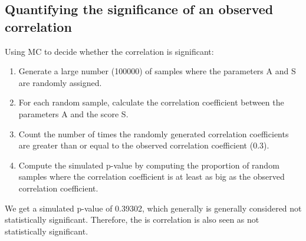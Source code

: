 \subsection{Quantifying the significance of an observed correlation}
Using MC to decide whether the correlation is significant:
\begin{enumerate}
    \item Generate a large number (100000) of samples where the parameters A and S are randomly assigned.
    \item For each random sample, calculate the correlation coefficient between the parameters A and the score S.
    \item Count the number of times the randomly generated correlation coefficients are greater than or equal to the observed correlation coefficient (0.3).
    \item Compute the simulated p-value by computing the proportion of random samples where the correlation coefficient is at least as big as the observed correlation coefficient.
\end{enumerate}

We get a simulated p-value of 0.39302, which generally is generally considered not statistically significant. Therefore, the is correlation is also seen as not statistically significant.